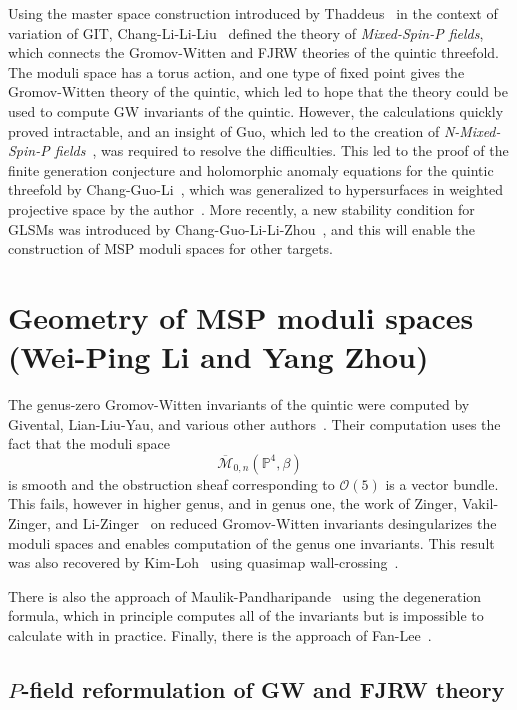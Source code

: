 \documentclass[10pt]{amsart}
\theoremstyle{definition}
\theoremstyle{remark}
\theoremstyle{plain}
\theoremstyle{definition}
\theoremstyle{remark}
\renewcommand{\P}{\mathbb{P}}
\newcommand{\Mbar}{\overline{\mathcal{M}}}
\newcommand{\mc}[1]{\mathcal{#1}}
\newcommand{\1}{\mathbf{1}}
\newcommand{\2}{\mathbf{2}}
\newcommand{\3}{\mathbf{3}}
\begin{document}
Using the master space construction introduced by Thaddeus~\cite{gitflips} in the context of variation of GIT, Chang-Li-Li-Liu~\cite{mspfermat,msp2} defined the theory of \textit{Mixed-Spin-P fields}, which connects the Gromov-Witten and FJRW theories of the quintic threefold. The moduli space has a torus action, and one type of fixed point gives the Gromov-Witten theory of the quintic, which led to hope that the theory could be used to compute GW invariants of the quintic. However, the calculations quickly proved intractable, and an insight of Guo, which led to the creation of \textit{N-Mixed-Spin-P fields}~\cite{nmsp}, was required to resolve the difficulties. This led to the proof of the finite generation conjecture and holomorphic anomaly equations for the quintic threefold by Chang-Guo-Li~\cite{nmsp2,nmsp3}, which was generalized to hypersurfaces in weighted projective space by the author~\cite{polynomiality,bcovme}. More recently, a new stability condition for GLSMs was introduced by Chang-Guo-Li-Li-Zhou~\cite{generalmsp}, and this will enable the construction of MSP moduli spaces for other targets.

\section{Geometry of MSP moduli spaces (Wei-Ping Li and Yang Zhou)}%
\label{sec:Prehistory}

The genus-zero Gromov-Witten invariants of the quintic were computed by Givental, Lian-Liu-Yau, and various other authors~\cite{eqgwinv,lly}. Their computation uses the fact that the moduli space
\[ \Mbar_{0,n}(\P^4, \beta) \]
is smooth and the obstruction sheaf corresponding to $\mc{O}(5)$ is a vector bundle. This fails, however in higher genus, and in genus one, the work of Zinger, Vakil-Zinger, and Li-Zinger~\cite{reducedgenus1,desingularizationgenusone,g1cilizinger} on reduced Gromov-Witten invariants desingularizes the moduli spaces and enables computation of the genus one invariants. This result was also recovered by Kim-Loh~\cite{kimlho} using quasimap wall-crossing~\cite{qmapwc}.

There is also the approach of Maulik-Pandharipande~\cite{topviewofgw} using the degeneration formula, which in principle computes all of the invariants but is impossible to calculate with in practice. Finally, there is the approach of Fan-Lee~\cite{fanlee}.

\subsection{$P$-field reformulation of GW and FJRW theory}%
\label{sub:P fields}
\end{document}
